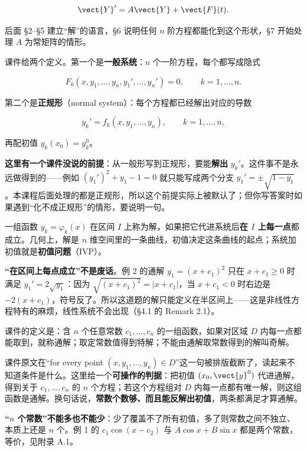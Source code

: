 \documentclass[11pt]{ctexart}
\begin{document}
\[
\vect{Y}'=A\vect{Y}+\vect{F}(t).
\]

后面 §2--§5 建立“解”的语言，§6 说明任何 $n$ 阶方程都能化到这个形状，§7 开始处理 $A$ 为常矩阵的情形。



课件给两个定义。第一个是\textbf{一般系统}：$n$ 个一阶方程，每个都写成隐式

\[
F_k(x,y_1,\dots,y_n,y_1',\dots,y_n')=0,\qquad k=1,\dots,n .
\]

第二个是\textbf{正规形}（normal system）：每个方程都已经解出对应的导数

\[
y_k'=f_k(x,y_1,\dots,y_n),\qquad k=1,\dots,n ,
\]

再配初值 $y_k(x_0)=y_k^0$。

\textbf{这里有一个课件没说的前提}：从一般形写到正规形，要能\textbf{解出} $y_k'$。这件事不是永远做得到的——例如 $(y_1')^2+y_1-1=0$ 就只能写成两个分支 $y_1'=\pm\sqrt{1-y_1}$。本课程后面处理的都是正规形，所以这个前提实际上被默认了；但你写答案时如果遇到“化不成正规形”的情形，要说明一句。


一组函数 $y_k=\varphi_k(x)$ 在区间 $I$ 上称为解，如果把它代进系统后\textbf{在 $I$ 上每一点}都成立。几何上，解是 $n$ 维空间里的一条曲线，初值决定这条曲线的起点；系统加初值就是\textbf{初值问题}（IVP）。

\textbf{“在区间上每点成立”不是废话}。例 2 的通解 $y_1=(x+c_1)^2$ 只在 $x+c_1\ge0$ 时满足 $y_1'=2\sqrt{y_1}$：因为 $\sqrt{(x+c_1)^2}=|x+c_1|$，当 $x+c_1<0$ 时右边是 $-2(x+c_1)$，符号反了。所以这道题的解只能定义在半区间上——这是非线性方程特有的麻烦，线性系统不会出现（§4.1 的 Remark 2.1）。


课件的定义是：含 $n$ 个任意常数 $c_1,\dots,c_n$ 的一组函数，如果对区域 $D$ 内每一点都能取到，就称通解；取定常数值得到特解；不能由通解取常数得到的解叫奇解。

课件原文在“for every point $(x,y_1,\dots,y_n)\in D$”这一句被排版截断了，读起来不知道条件是什么。这里给一个\textbf{可操作的判据}：把初值 $(x_0,\vect{y}^0)$ 代进通解，得到关于 $c_1,\dots,c_n$ 的 $n$ 个方程；若这个方程组对 $D$ 内每一点都有唯一解，则这组函数是通解。换句话说，\textbf{常数个数够、而且能反解出初值}，两条都满足才算通解。

\textbf{“$n$ 个常数”不能多也不能少}：少了覆盖不了所有初值，多了则常数之间不独立、本质上还是 $n$ 个。例 1 的 $c_1\cos(x-c_2)$ 与 $A\cos x+B\sin x$ 都是两个常数，等价，见附录 A.1。
\end{document}
